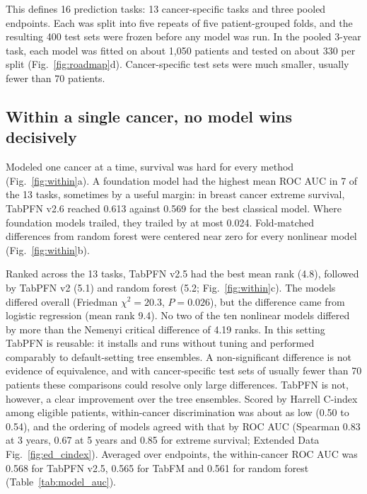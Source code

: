 \documentclass[11pt, a4paper, onecolumn, confidential, copyright]{hawkfranklin}
\begin{document}
This defines 16 prediction tasks: 13 cancer-specific tasks and three pooled endpoints. Each was split into five repeats of five patient-grouped folds, and the resulting 400 test sets were frozen before any model was run. In the pooled 3-year task, each model was fitted on about 1,050 patients and tested on about 330 per split (Fig.~\ref{fig:roadmap}d). Cancer-specific test sets were much smaller, usually fewer than 70 patients.

\begin{table}[ht]
\centering
\caption{Cancer cohort size and endpoint eligibility. Extreme survival contrasts death within 3 years against survival beyond 5 years. NA, endpoint-specific cohort not formed.}
\label{tab:cohorts}

\end{table}

\subsection*{Within a single cancer, no model wins decisively}

Modeled one cancer at a time, survival was hard for every method (Fig.~\ref{fig:within}a). A foundation model had the highest mean ROC AUC in 7 of the 13 tasks, sometimes by a useful margin: in breast cancer extreme survival, TabPFN v2.6 reached 0.613 against 0.569 for the best classical model. Where foundation models trailed, they trailed by at most 0.024. Fold-matched differences from random forest were centered near zero for every nonlinear model (Fig.~\ref{fig:within}b).

Ranked across the 13 tasks, TabPFN v2.5 had the best mean rank (4.8), followed by TabPFN v2 (5.1) and random forest (5.2; Fig.~\ref{fig:within}c). The models differed overall (Friedman $\chi^2 = 20.3$, $P = 0.026$), but the difference came from logistic regression (mean rank 9.4). No two of the ten nonlinear models differed by more than the Nemenyi critical difference of 4.19 ranks.\citep{demsar2006statistical} In this setting TabPFN is reusable: it installs and runs without tuning and performed comparably to default-setting tree ensembles. A non-significant difference is not evidence of equivalence, and with cancer-specific test sets of usually fewer than 70 patients these comparisons could resolve only large differences. TabPFN is not, however, a clear improvement over the tree ensembles. Scored by Harrell C-index among eligible patients, within-cancer discrimination was about as low (0.50 to 0.54), and the ordering of models agreed with that by ROC AUC (Spearman 0.83 at 3 years, 0.67 at 5 years and 0.85 for extreme survival; Extended Data Fig.~\ref{fig:ed_cindex}). Averaged over endpoints, the within-cancer ROC AUC was 0.568 for TabPFN v2.5, 0.565 for TabFM and 0.561 for random forest (Table~\ref{tab:model_auc}).
\end{document}
